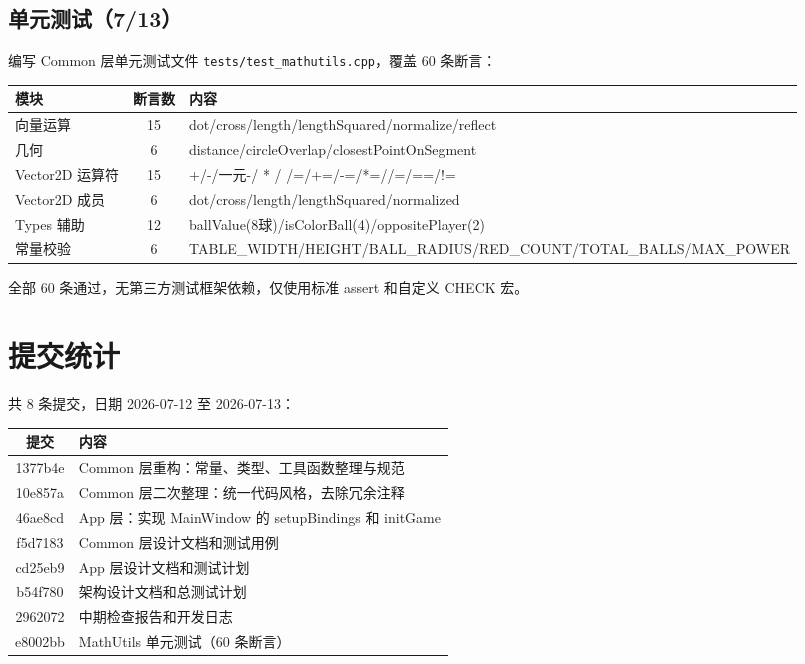 \documentclass[11pt]{ctexart}
\begin{document}
\subsection{单元测试（7/13）}

编写 Common 层单元测试文件 \texttt{tests/test\_mathutils.cpp}，覆盖 60 条断言：

\begin{center}
\begin{tabular}{|l|c|l|}
\hline
\textbf{模块} & \textbf{断言数} & \textbf{内容} \\
\hline
向量运算 & 15 & dot/cross/length/lengthSquared/normalize/reflect \\
几何 & 6 & distance/circleOverlap/closestPointOnSegment \\
Vector2D 运算符 & 15 & +/-/一元-/ * /  /=/+=/-=/*=//=/==/!=  \\
Vector2D 成员 & 6 & dot/cross/length/lengthSquared/normalized \\
Types 辅助 & 12 & ballValue(8球)/isColorBall(4)/oppositePlayer(2) \\
常量校验 & 6 & TABLE\_WIDTH/HEIGHT/BALL\_RADIUS/RED\_COUNT/TOTAL\_BALLS/MAX\_POWER \\
\hline
\end{tabular}
\end{center}

全部 60 条通过，无第三方测试框架依赖，仅使用标准 assert 和自定义 CHECK 宏。

\section{提交统计}

共 8 条提交，日期 2026-07-12 至 2026-07-13：

\begin{center}
\begin{tabular}{|c|l|}
\hline
\textbf{提交} & \textbf{内容} \\
\hline
1377b4e & Common 层重构：常量、类型、工具函数整理与规范 \\
10e857a & Common 层二次整理：统一代码风格，去除冗余注释 \\
46ae8cd & App 层：实现 MainWindow 的 setupBindings 和 initGame \\
f5d7183 & Common 层设计文档和测试用例 \\
cd25eb9 & App 层设计文档和测试计划 \\
b54f780 & 架构设计文档和总测试计划 \\
2962072 & 中期检查报告和开发日志 \\
e8002bb & MathUtils 单元测试（60 条断言） \\
\hline
\end{tabular}
\end{center}
\end{document}
